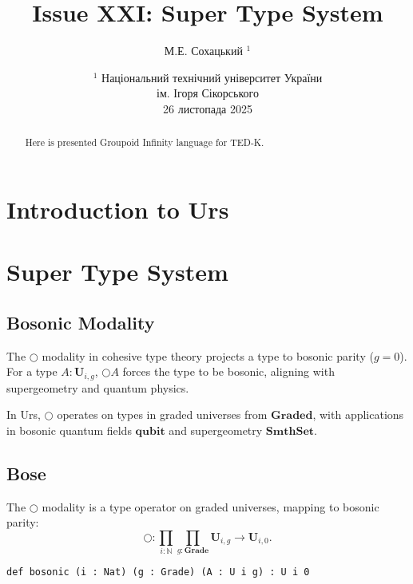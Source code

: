 \documentclass{article}
\begin{document}
\author { М.Е. Сохацький $^1$ }
\title { Issue XXI: Super Type System }
\date{ \small $^1$ Національний технічний університет України \\
       ім. Ігоря Сікорського \\
       26 листопада 2025 }
\maketitle

\begin{abstract}
Here is presented Groupoid Infinity language for TED-K.
\end{abstract}

\ifincludeTOC
  \tableofcontents
\fi


\section{Introduction to Urs}

\section{Super Type System}

\subsection{Bosonic Modality}

The $\bigcirc$ modality in cohesive type theory projects a type to bosonic parity ($g = 0$).
For a type $A : \mathbf{U}_{i,g}$, $\bigcirc A$ forces the type to be bosonic,
aligning with supergeometry and quantum physics.

In Urs, $\bigcirc$ operates on types in graded universes from $\mathbf{Graded}$,
with applications in bosonic quantum fields $\mathbf{qubit}$ and supergeometry
$\mathbf{SmthSet}$.

\subsection{Bose}

\begin{definition}\label{def:bosonic-formation}
The $\bigcirc$ modality is a type operator on graded universes, mapping to bosonic parity:
\[
    \bigcirc : \prod_{i : \mathbb{N}} \prod_{g : \mathbf{Grade}}
    \mathbf{U}_{i,g} \to \mathbf{U}_{i,0}.
\]
\begin{lstlisting}[mathescape=true]
def bosonic (i : Nat) (g : Grade) (A : U i g) : U i 0
\end{lstlisting}
\end{definition}
\end{document}
